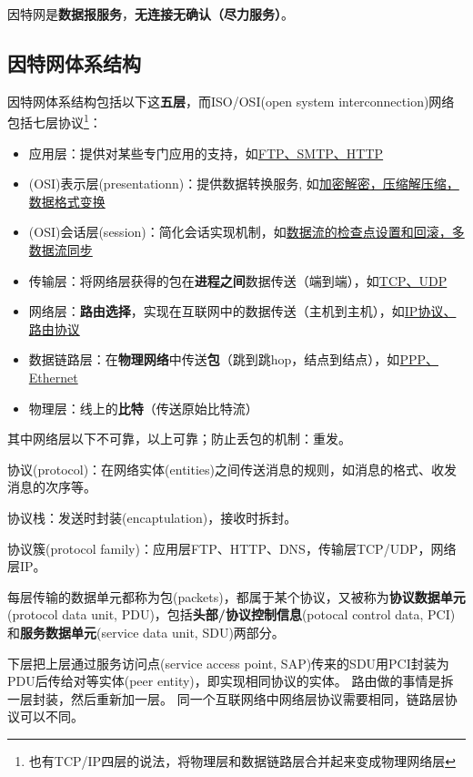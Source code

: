因特网是\textbf{数据报服务}，\textbf{无连接无确认（尽力服务）}。

\subsection{因特网体系结构}
因特网体系结构包括以下这\textbf{五层}，而ISO/OSI(open system interconnection)网络包括七层协议\footnote{也有TCP/IP四层的说法，将物理层和数据链路层合并起来变成物理网络层}：
\begin{itemize}
	\item 应用层：提供对某些专门应用的支持，如\underline{FTP、SMTP、HTTP}
	\item (OSI)表示层(presentationn)：提供数据转换服务, 如\underline{加密解密，压缩解压缩，数据格式变换}
	\item (OSI)会话层(session)：简化会话实现机制，如\underline{数据流的检查点设置和回滚，多数据流同步}
	\item 传输层：将网络层获得的包在\textbf{进程之间}数据传送（端到端），如\underline{TCP、UDP}
	\item 网络层：\textbf{路由选择}，实现在互联网中的数据传送（主机到主机），如\underline{IP协议、路由协议}
	\item 数据链路层：在\textbf{物理网络}中传送\textbf{包}（跳到跳hop，结点到结点），如\underline{PPP、Ethernet}
	\item 物理层：线上的\textbf{比特}（传送原始比特流）
\end{itemize}
\par 其中网络层以下不可靠，以上可靠；防止丢包的机制：重发。
\par 协议(protocol)：在网络实体(entities)之间传送消息的规则，如消息的格式、收发消息的次序等。
\par 协议栈：发送时封装(encaptulation)，接收时拆封。
\par 协议簇(protocol family)：应用层FTP、HTTP、DNS，传输层TCP/UDP，网络层IP。

每层传输的数据单元都称为包(packets)，都属于某个协议，又被称为\textbf{协议数据单元}(protocol data unit, PDU)，包括\textbf{头部/协议控制信息}(potocal control data, PCI)和\textbf{服务数据单元}(service data unit, SDU)两部分。
\begin{center}
\end{center}
下层把上层通过服务访问点(service access point, SAP)传来的SDU用PCI封装为PDU后传给对等实体(peer entity)，即实现相同协议的实体。
路由做的事情是拆一层封装，然后重新加一层。
同一个互联网络中网络层协议需要相同，链路层协议可以不同。


